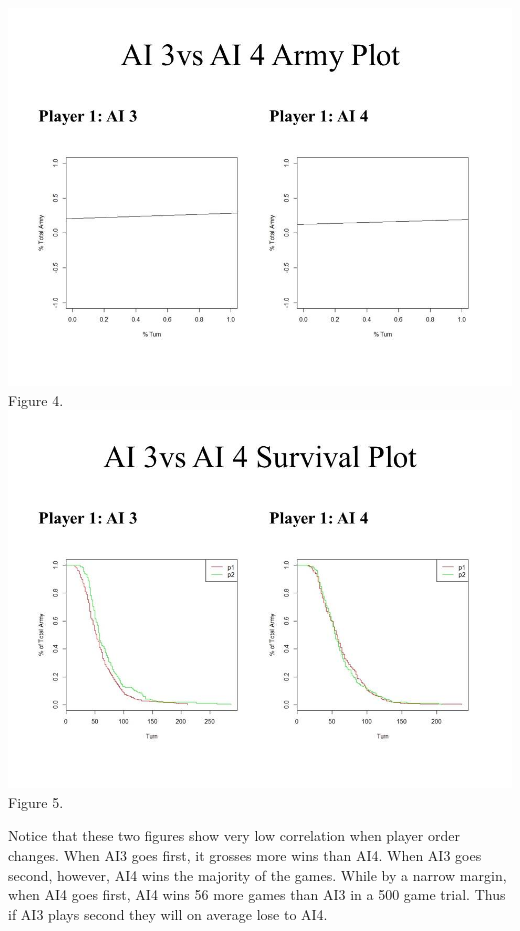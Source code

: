 \documentclass[12pt]{article}  %
\begin{document}
\begin{center}
\includegraphics[scale=0.6]{images/Figure_4.jpg}\\
{\footnotesize Figure 4.}\\
\includegraphics[scale=0.6]{images/Figure_5.jpg}\\
{\footnotesize Figure 5.}
\end{center}

Notice that these two figures show very low correlation when player order changes. When AI3 goes first, it grosses more wins than AI4. When AI3 goes second, however, AI4 wins the majority of the games. While by a narrow margin, when AI4 goes first, AI4 wins 56 more games than AI3 in a 500 game trial. Thus if AI3 plays second they will on average lose to AI4. 
\end{document}
